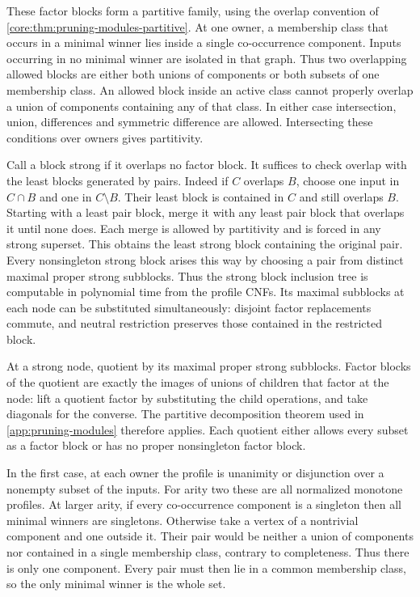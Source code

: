 These factor blocks form a partitive family, using
the overlap convention of \cref{core:thm:pruning-modules-partitive}.
At one owner, a membership class that occurs in a
minimal winner lies inside a single co-occurrence
component. Inputs occurring in no minimal winner
are isolated in that graph. Thus two overlapping
allowed blocks are either both unions of components
or both subsets of one membership class. An allowed
block inside an active class cannot properly overlap
a union of components containing any of that class.
In either case intersection, union, differences and
symmetric difference are allowed. Intersecting these
conditions over owners gives partitivity.

Call a block strong if it overlaps no factor block.
It suffices to check overlap with the least blocks
generated by pairs. Indeed if $C$ overlaps $B$, choose
one input in $C\cap B$ and one in $C\setminus B$.
Their least block is contained in $C$ and still
overlaps $B$. Starting with a least pair block, merge
it with any least pair block that overlaps it until
none does. Each merge is allowed by partitivity and
is forced in any strong superset. This obtains the
least strong block containing the original pair.
Every nonsingleton strong block arises this way by
choosing a pair from distinct maximal proper strong
subblocks. Thus the strong block inclusion tree is
computable in polynomial time from the profile CNFs.
Its maximal subblocks at each node can be substituted
simultaneously: disjoint factor replacements commute,
and neutral restriction preserves those contained in
the restricted block.

At a strong node, quotient by its maximal proper
strong subblocks. Factor blocks of the quotient are
exactly the images of unions of children that factor
at the node: lift a quotient factor by substituting
the child operations, and take diagonals for the
converse. The partitive decomposition theorem used
in \cref{app:pruning-modules} therefore applies.
Each quotient either allows every subset as a factor
block or has no proper nonsingleton factor block.

In the first case, at each owner the profile is
unanimity or disjunction over a nonempty subset of
the inputs. For arity two these are all normalized
monotone profiles. At larger arity, if every
co-occurrence component is a singleton then all
minimal winners are singletons. Otherwise take a
vertex of a nontrivial component and one outside
it. Their pair would be neither a union of components
nor contained in a single membership class, contrary
to completeness. Thus there is only one component.
Every pair must then lie in a common membership
class, so the only minimal winner is the whole set.

